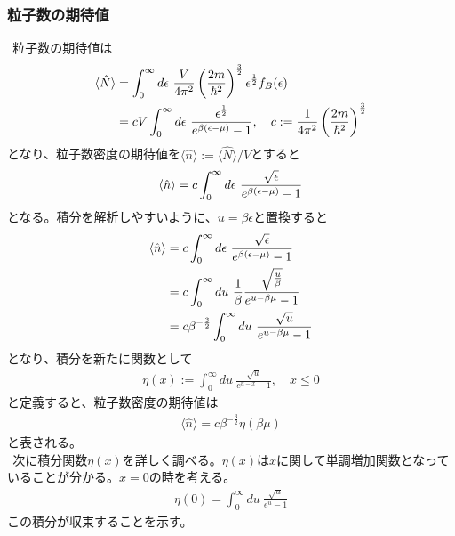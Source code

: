 \documentclass[dvipdfmx, 11pt, a4paper]{jsarticle}
\theoremstyle{definition}
\begin{document}
\subsubsection{粒子数の期待値}
    $\ \ $粒子数の期待値は
    \begin{align}
        \langle \hat{N} \rangle &= \int_0^{\infty} d\epsilon\ \frac{V}{4 \pi^2} \left( \frac{2m}{\hbar^2} \right)^{\frac{3}{2}} \epsilon^\frac{1}{2} f_B(\epsilon) \notag \\
        &= cV \int_0^{\infty} d\epsilon\  \frac{\epsilon^\frac{1}{2}}{e^{\beta (\epsilon - \mu)} - 1}, \quad c := \frac{1}{4 \pi^2} \left( \frac{2m}{\hbar^2} \right)^{\frac{3}{2}} \notag 
    \end{align}
    となり、粒子数密度の期待値を$\langle \hat{n} \rangle := \langle \hat{N} \rangle / V$とすると
    \begin{align}
        \langle \hat{n} \rangle = c \int_0^{\infty} d\epsilon\  \frac{\sqrt{\epsilon}}{e^{\beta (\epsilon - \mu)} - 1} \notag 
    \end{align}
    となる。積分を解析しやすいように、$u = \beta \epsilon$と置換すると
    \begin{align}
                \langle \hat{n} \rangle &= c \int_0^{\infty} d\epsilon\  \frac{\sqrt{\epsilon}}{e^{\beta (\epsilon - \mu)} - 1}  \notag \\
                &= c \int_0^{\infty} du\ \frac{1}{\beta} \frac{\sqrt{\frac{u}{\beta}}}{e^{u - \beta \mu} - 1} \notag \\
                &= c \beta^{-\frac{3}{2}}\int_0^{\infty} du\ \frac{\sqrt{u}}{e^{u - \beta \mu} - 1} \notag 
    \end{align}
    となり、積分を新たに関数として
    \begin{align}
        \eta (x) := \int_0^{\infty} du\ \frac{\sqrt{u}}{e^{u - x} - 1},\quad x \le 0
    \end{align}
    と定義すると、粒子数密度の期待値は
    \begin{align}
        \langle \hat{n} \rangle = c \beta^{-\frac{3}{2}} \eta (\beta \mu)
    \end{align}
    と表される。\\
    $\ \ $次に積分関数$\eta(x)$を詳しく調べる。$\eta (x)$は$x$に関して単調増加関数となっていることが分かる。$x =0$の時を考える。
    \begin{align}
        \eta (0) = \int_0^{\infty} du\ \frac{\sqrt{u}}{e^{u} - 1}
    \end{align}
    この積分が収束することを示す。\\
\end{document}
